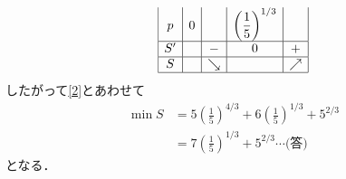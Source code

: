 \documentclass[a4j]{jarticle}
\begin{document}
\begin{multicols}{2}
\begin{enumerate}[(1)]
\begin{align*}
\begin{array}{|c|c|c|c|c|}
               p & 0 &   & \left(\dfrac{1}{5}\right)^{1/3} &   \\ \hline
               S' &   & - & 0                          & + \\ \hline
               S  &   & \searrow&                          &\nearrow \\ \hline
               \end{array}
          \end{align*}
     したがって\eqref{2}とあわせて
          \begin{align*}
          \min S&=5\left(\frac{1}{5}\right)^{4/3}+6\left(\frac{1}{5}\right)^{1/3}+5^{2/3} \\
          &=7\left(\frac{1}{5}\right)^{1/3}+5^{2/3}\cdots\text{(答)}
          \end{align*}
     となる．     
     
          
               
     \end{enumerate}
\newpage
\end{multicols}
\end{document}
